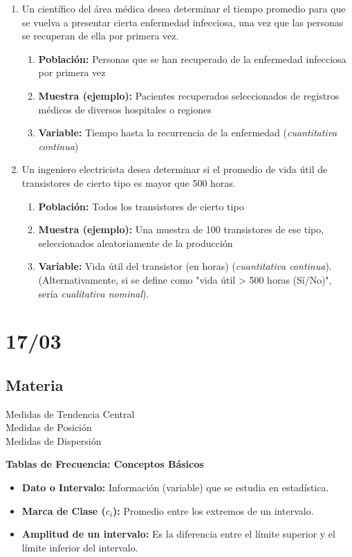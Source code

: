 \documentclass[12pt, letterpaper]{article}
\begin{document}
\begin{enumerate}
    \item Un científico del área médica desea determinar el tiempo promedio para que se vuelva a presentar cierta enfermedad infecciosa, una vez que las personas se recuperan de ella por primera vez.
        \begin{enumerate}
            \item \textbf{Población:} Personas que se han recuperado de la enfermedad infecciosa por primera vez
            \item \textbf{Muestra (ejemplo):} Pacientes recuperados seleccionados de registros médicos de diversos hospitales o regiones
            \item \textbf{Variable:} Tiempo hasta la recurrencia de la enfermedad (\textit{cuantitativa continua})
        \end{enumerate}

    \item Un ingeniero electricista desea determinar si el promedio de vida útil de transistores de cierto tipo es mayor que 500 horas.
        \begin{enumerate}
            \item \textbf{Población:} Todos los transistores de cierto tipo
            \item \textbf{Muestra (ejemplo):} Una muestra de 100 transistores de ese tipo, seleccionados aleatoriamente de la producción
            \item \textbf{Variable:} Vida útil del transistor (en horas) (\textit{cuantitativa continua}). (Alternativamente, si se define como "vida útil > 500 horas (Sí/No)", sería \textit{cualitativa nominal}).
        \end{enumerate}
\end{enumerate}
\newpage

\section{17/03}
\subsection{Materia}
Medidas de Tendencia Central \\
Medidas de Posición \\
Medidas de Dispersión 

\textbf{Tablas de Frecuencia: Conceptos Básicos}
\begin{itemize}
    \item \textbf{Dato o Intervalo:} Información (variable) que se estudia en estadística.
    \item \textbf{Marca de Clase ($c_i$):} Promedio entre los extremos de un intervalo.
    \item \textbf{Amplitud de un intervalo:} Es la diferencia entre el límite superior y el límite inferior del intervalo.
\end{itemize}
\end{document}
